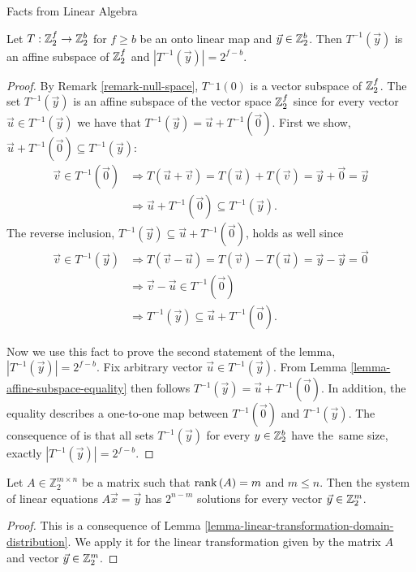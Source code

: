 \begin{chapter}{Facts from Linear Algebra}
\begin{lemma}
\label{lemma-linear-transformation-domain-distribution}
Let $T: \mathbb{Z}_{2}^{f} \rightarrow \mathbb{Z}_{2}^{b}$ for $f \geq b$ be an onto linear map and $\vec{y} \in \mathbb{Z}_{2}^{b}$. Then $T^{-1}(\vec{y})$ is an affine subspace of $\mathbb{Z}_{2}^{f}$ and $|T^{-1}(\vec{y})| = 2 ^ {f - b}$.
\end{lemma}
\begin{proof}
By Remark \ref{remark-null-space}, $T{^-1}(0)$ is a vector subspace of $\mathbb{Z}_{2}^{f}$.
The set $T^{-1}(\vec{y})$ is an affine subspace of the vector space $\mathbb{Z}_{2}^{f}$ since for every vector $\vec{u} \in T^{-1}(\vec{y})$ we have that $T^{-1}(\vec{y}) = \vec{u} + T^{-1}(\vec{0})$. First we show, $\vec{u} + T^{-1}(\vec{0}) \subseteq T^{-1}(\vec{y})$:
\[
\begin{split}
\vec{v} \in T^{-1}(\vec{0}) 
	& \Rightarrow T(\vec{u} + \vec{v}) = T(\vec{u}) + T(\vec{v}) = \vec{y} + \vec{0} = \vec{y}  \\
	& \Rightarrow \vec{u} + T^{-1}(\vec{0}) \subseteq T^{-1}(\vec{y}) \text{.}
\end{split}
\]
The reverse inclusion, $T^{-1}(\vec{y}) \subseteq \vec{u} + T^{-1}(\vec{0})$, holds as well since
\[
\begin{split}
\vec{v} \in T^{-1}(\vec{y}) 
	& \Rightarrow T(\vec{v} - \vec{u}) = T(\vec{v}) - T(\vec{u}) = \vec{y} - \vec{y} = \vec{0} \\
	& \Rightarrow \vec{v} - \vec{u} \in T^{-1}(\vec{0}) \\
	& \Rightarrow T^{-1}(\vec{y}) \subseteq \vec{u} + T^{-1}(\vec{0}) \text{.}
\end{split}
\]

Now we use this fact to prove the second statement of the lemma, $|T^{-1}(\vec{y})| = 2 ^ {f - b}$. Fix arbitrary vector $\vec{u} \in T^{-1}(\vec{y})$. From Lemma \ref{lemma-affine-subspace-equality} then follows $T^{-1}(\vec{y}) = \vec{u} + T^{-1}(\vec{0})$. In addition, the equality describes a one-to-one map between $T^{-1}(\vec{0})$ and $T^{-1}(\vec{y})$. The consequence of is that all sets $T^{-1}(\vec{y})$ for every $y \in \mathbb{Z}_{2}^{b}$ have the~same size, exactly $|T^{-1}(\vec{y})| = 2^{f - b}$.
\end{proof}

\begin{lemma}
\label{lemma-system-of-linear-equations-solution-count}
Let $A \in \mathbb{Z}_2^{m \times n}$ be a matrix such that $\mathrm{rank}\left({A}\right) = m$ and $m \leq n$. Then the system of linear equations $A\vec{x} = \vec{y}$ has $2 ^ {n - m}$ solutions for every vector $\vec{y} \in \mathbb{Z}_{2}^{m}$.
\end{lemma}
\begin{proof}
This is a consequence of Lemma \ref{lemma-linear-transformation-domain-distribution}. We apply it for the linear transformation given by the matrix $A$ and vector $\vec{y} \in \mathbb{Z}_{2}^{m}$.


\end{proof}
\end{chapter}
